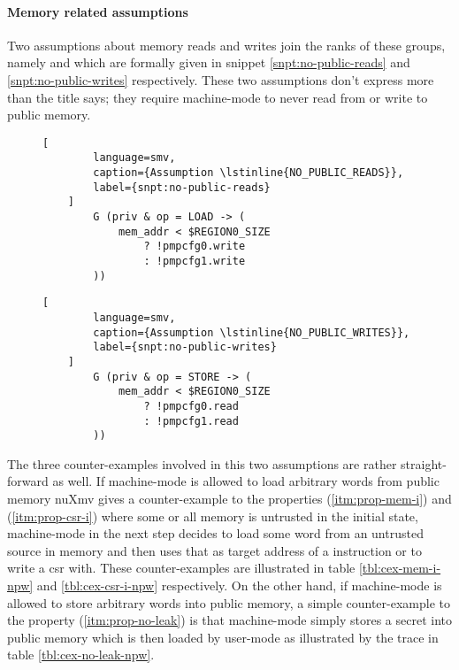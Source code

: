 \paragraph{Memory related assumptions}
Two assumptions about memory reads and writes join the ranks of these groups, namely  and  which are formally given in snippet \ref{snpt:no-public-reads} and \ref{snpt:no-public-writes} respectively.
These two assumptions don't express more than the title says; they require machine-mode to never read from or write to public memory.

\begin{figure}
    \begin{lstlisting}[
        language=smv,
        caption={Assumption \lstinline{NO_PUBLIC_READS}},
        label={snpt:no-public-reads}
    ]
        G (priv & op = LOAD -> (
            mem_addr < $REGION0_SIZE
                ? !pmpcfg0.write
                : !pmpcfg1.write
        ))
    \end{lstlisting}

    \begin{lstlisting}[
        language=smv,
        caption={Assumption \lstinline{NO_PUBLIC_WRITES}},
        label={snpt:no-public-writes}
    ]
        G (priv & op = STORE -> (
            mem_addr < $REGION0_SIZE
                ? !pmpcfg0.read
                : !pmpcfg1.read
        ))
    \end{lstlisting}
\end{figure}

The three counter-examples involved in this two assumptions are rather straight-forward as well.
If machine-mode is allowed to load arbitrary words from public memory nuXmv gives a counter-example to the properties  (\ref{itm:prop-mem-i}) and  (\ref{itm:prop-csr-i}) where some or all memory is untrusted in the initial state, machine-mode in the next step decides to load some word from an untrusted source in memory and then uses that as target address of a  instruction or to write a \gls{csr} with.
These counter-examples are illustrated in table \ref{tbl:cex-mem-i-npw} and \ref{tbl:cex-csr-i-npw} respectively.
On the other hand, if machine-mode is allowed to store arbitrary words into public memory, a simple counter-example to the  property (\ref{itm:prop-no-leak}) is that machine-mode simply stores a secret into public memory which is then loaded by user-mode as illustrated by the trace in table \ref{tbl:cex-no-leak-npw}.

